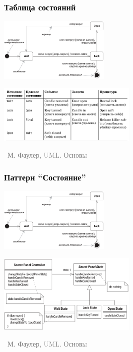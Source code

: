 \documentclass[xetex,mathserif,serif]{beamer}
\newcommand{\attribution}[1] {
    \vspace{-5mm}\begin{flushright}\begin{scriptsize}\textcolor{gray}{\textcopyright\, #1}\end{scriptsize}\end{flushright}
}
\begin{document}
    \begin{frame}
        \frametitle{Таблица состояний}
        \begin{center}
            \includegraphics[width=0.4\textwidth]{stateTransitionSyntax.png}
        \end{center}

        \begin{center}
            \includegraphics[width=0.5\textwidth]{stateTransitionStateTable.png}
            \attribution{М. Фаулер, UML. Основы}
        \end{center}
    \end{frame}

    \begin{frame}
        \frametitle{Паттерн ``Состояние''}
        \begin{center}
            \includegraphics[width=0.4\textwidth]{stateTransitionSyntax.png}
        \end{center}

        \begin{center}
            \includegraphics[width=0.5\textwidth]{stateTransitionStatePattern.png}
            \attribution{М. Фаулер, UML. Основы}
        \end{center}
    \end{frame}
\end{document}
